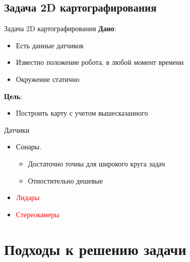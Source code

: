 \documentclass[9pt]{beamer}
\begin{document}
      

\subsection{Задача 2D картографирования}

\begin{frame}{Задача 2D картографирования}
\textbf{Дано}:
\begin{itemize}

  \item
  {
    Есть данные датчиков
  }
  \item
  {
    Известно положение робота, в любой момент времени
  }
  \item
  {
    Окружение статично
  }
\end{itemize}
\textbf{Цель}:
\begin{itemize}
  \item
  {
    Построить карту с учетом вышесказанного
  }
\end{itemize}
\end{frame}

\begin{frame}{Датчики}

\begin{itemize}
  \item
  {
    Сонары.
    \begin{itemize}
    \item
    {
      Достаточно точны для широкого круга задач
    }
    \item
    {
      Отностительно дешевые
    }
    \end{itemize}
  }
  \item
  {
    \textcolor{red}{Лидары}
  }
  \item
  {
    \textcolor{red}{Стереокамеры}
  }
\end{itemize}

\end{frame}

\section{Подходы к решению задачи}
\end{document}
